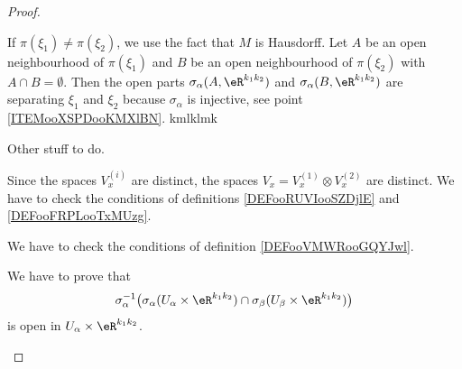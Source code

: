 \begin{proof}
\begin{subproof}
		If \( \pi(\xi_1)\neq \pi(\xi_2)\), we use the fact that \( M\) is Hausdorff. Let \( A\) be an open neighbourhood of \( \pi(\xi_1)\) and \( B\) be an open neighbourhood of \( \pi(\xi_2)\) with \( A\cap B=\emptyset\). Then the open parts \( \sigma_{\alpha}(A,\eR^{k_1k_2})\) and \( \sigma_{\alpha}(B,\eR^{k_1k_2})\) are separating \( \xi_1\) and \( \xi_2\) because \(\sigma_{\alpha}   \) is injective, see point \ref{ITEMooXSPDooKMXlBN}.
		kmlklmk
	\end{subproof}
	\begin{proofpart}
		Other stuff to do.
	\end{proofpart}
	Since the spaces \( V^{(i)}_x\) are distinct, the spaces \( V_x=V_x^{(1)}\otimes V_x^{(2)}\) are distinct.
	We have to check the conditions of definitions \ref{DEFooRUVIooSZDjlE} and \ref{DEFooFRPLooTxMUzg}.
	\begin{subproof}
		We have to check the conditions of definition \ref{DEFooVMWRooGQYJwl}.
		\begin{subproof}

			We have to prove that
			\begin{equation}
				\sigma_{\alpha}^{-1}\big( \sigma_{\alpha}(U_{\alpha}\times \eR^{k_1k_2})\cap  \sigma_{\beta}(U_{\beta}\times \eR^{k_1k_2}) \big)
			\end{equation}
			is open in \( U_{\alpha}\times \eR^{k_1k_2}\).


\end{subproof}
\end{subproof}
\end{proof}
